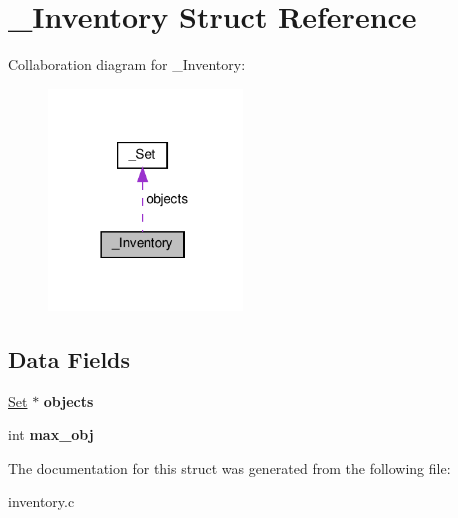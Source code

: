 \hypertarget{struct__Inventory}{}\section{\+\_\+\+Inventory Struct Reference}
\label{struct__Inventory}


Collaboration diagram for \+\_\+\+Inventory\+:\nopagebreak
\begin{figure}[H]
\begin{center}
\leavevmode
\includegraphics[width=146pt]{struct__Inventory__coll__graph}
\end{center}
\end{figure}
\subsection*{Data Fields}
\begin{DoxyCompactItemize}
\item 
\mbox{\label{struct__Inventory_a478e4b50a62b9e7d5b17e335319faa97}} 
\hyperlink{struct__Set}{Set} $\ast$ {\bfseries objects}
\item 
\mbox{\label{struct__Inventory_a125272de261da5a37d2dbf47d82d81c4}} 
int {\bfseries max\+\_\+obj}
\end{DoxyCompactItemize}


The documentation for this struct was generated from the following file\+:\begin{DoxyCompactItemize}
\item 
inventory.\+c\end{DoxyCompactItemize}
